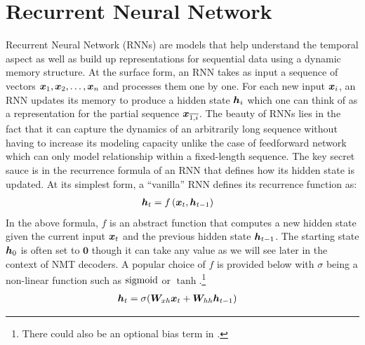 \section{Recurrent Neural Network}
Recurrent Neural Network (RNNs) \cite{elman90} are models that help understand
the temporal aspect as well as build up representations for sequential data
using a dynamic memory structure. At the surface form, an RNN takes as input a sequence of vectors $\bm{x}_{1},
\bm{x}_{2}, \ldots, \bm{x}_{n}$ and processes them one by one. For each
new input $\bm{x}_{i}$, an RNN updates its memory to produce a hidden state
$\bm{h}_{i}$ which one can think of as a representation for the partial sequence
$\bm{x}_{\overline{1,i}}$. %
The beauty of RNNs lies in the fact that it can
capture the dynamics of an arbitrarily long sequence without having to increase its modeling
capacity unlike the case of feedforward network which can only model
relationship within a fixed-length sequence. The key secret sauce is in the
recurrence formula of an RNN that defines how its hidden state is updated. At
its simplest form, a ``vanilla'' RNN defines its recurrence function as:
\begin{align}
\bm{h}_{t} &= f\left(\bm{x}_{t}, \bm{h}_{t-1}\right) \label{e:abstract_rnn}
\end{align}
In the above formula, $f$ is an abstract function that computes a new hidden state given the current input $\bm{x}_{t}$ and the
previous hidden state $\bm{h}_{t-1}$. The starting state $\bm{h}_{0}$ is often set to
$\bm{0}$ though it can take any value as we will see later in the context
of NMT decoders. A popular choice of $f$ is provided below with $\sigma$ being a
non-linear function such as $\operatorname{sigmoid}$ or $\tanh$.\footnote{There could also be
an optional bias term in .}
\begin{align}
\hid{t} &= \sigma(\W{xh}\x{t} + \W{hh}\hid{t-1} \label{e:vanilla_rnn}) %
\end{align}


